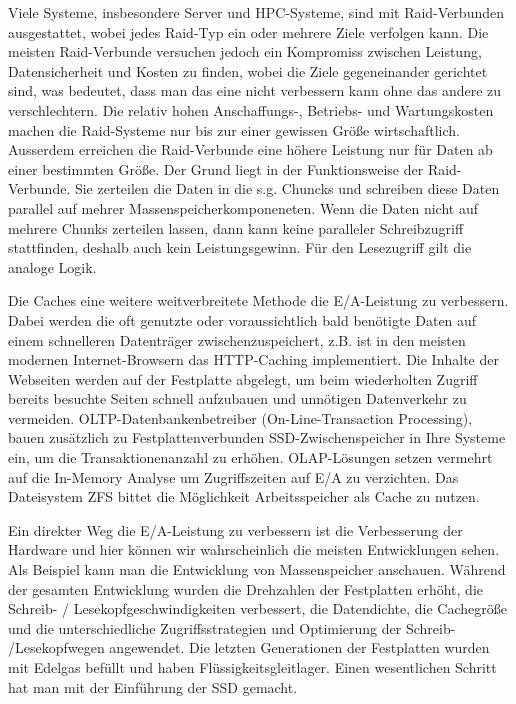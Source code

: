 Viele Systeme, insbesondere Server und HPC-Systeme, sind mit Raid-Verbunden ausgestattet, wobei jedes Raid-Typ ein oder mehrere Ziele verfolgen kann. Die meisten Raid-Verbunde versuchen jedoch ein Kompromiss zwischen Leistung, Datensicherheit und Kosten zu finden, wobei die Ziele gegeneinander gerichtet sind, was bedeutet, dass man das eine nicht verbessern kann ohne das andere zu verschlechtern. Die relativ hohen Anschaffungs-, Betriebs- und Wartungskosten machen die Raid-Systeme nur bis zur einer gewissen Größe wirtschaftlich. Ausserdem erreichen die Raid-Verbunde eine höhere Leistung nur für Daten ab einer bestimmten Größe. Der Grund liegt in der Funktionsweise der Raid-Verbunde. Sie zerteilen die Daten in die s.g. Chuncks und schreiben diese Daten parallel auf mehrer Massenspeicherkomponeneten. Wenn die Daten nicht auf mehrere Chunks zerteilen lassen, dann kann keine paralleler Schreibzugriff stattfinden, deshalb auch kein Leistungsgewinn. Für den Lesezugriff gilt die analoge Logik.

Die Caches eine weitere weitverbreitete Methode die E/A-Leistung zu verbessern. Dabei werden die oft genutzte oder voraussichtlich bald benötigte Daten auf einem schnelleren Datenträger zwischenzuspeichert, z.B. ist in den meisten modernen Internet-Browsern das HTTP-Caching implementiert. Die Inhalte der Webseiten werden auf der Festplatte abgelegt, um beim wiederholten Zugriff bereits besuchte Seiten schnell aufzubauen und unnötigen Datenverkehr zu vermeiden. 
OLTP-Datenbankenbetreiber (On-Line-Transaction Processing), bauen zusätzlich zu Festplattenverbunden SSD-Zwischenspeicher in Ihre Systeme ein, um die Transaktionenanzahl zu erhöhen. 
OLAP-Lösungen setzen vermehrt auf die In-Memory Analyse um Zugriffszeiten auf E/A zu verzichten.
Das Dateisystem ZFS bittet die Möglichkeit Arbeitsspeicher als Cache zu nutzen. 

Ein direkter Weg die E/A-Leistung zu verbessern ist die Verbesserung der Hardware und hier können wir wahrscheinlich die meisten Entwicklungen sehen. Als Beispiel kann man die Entwicklung von Massenspeicher anschauen. Während der gesamten Entwicklung wurden die Drehzahlen der Festplatten erhöht, die Schreib- / Lesekopfgeschwindigkeiten verbessert, die Datendichte, die Cachegröße und die unterschiedliche Zugriffsstrategien und Optimierung der Schreib- /Lesekopfwegen angewendet. Die letzten Generationen der Festplatten wurden mit Edelgas befüllt und haben Flüssigkeitsgleitlager. Einen wesentlichen Schritt hat man mit der Einführung der SSD gemacht. 

